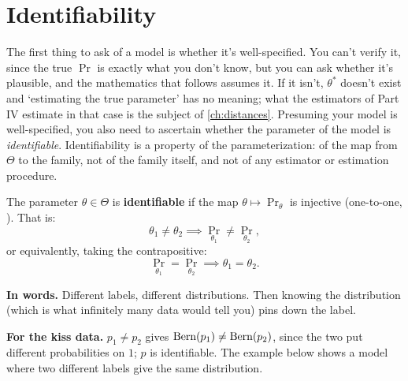 \section{Identifiability}
\label{sec:models-identifiability}

The first thing to ask of a model is whether it's well-specified.
You can't verify it, since the true $\Pr$ is exactly what you don't know, but you can ask whether it's plausible, and the mathematics that follows assumes it.
If it isn't, $\theta^*$ doesn't exist and `estimating the true parameter' has no meaning; what the estimators of Part IV estimate in that case is the subject of \cref{ch:distances}.
Presuming your model is well-specified, you also need to ascertain whether the parameter of the model is \textit{identifiable}.
Identifiability is a property of the parameterization: of the map from $\Theta$ to the family, not of the family itself, and not of any estimator or estimation procedure.

\begin{definition}[Identifiability]
\label{def:identifiable}
The parameter $\theta \in \Theta$ is \textbf{identifiable} if the map $\theta \mapsto \Pr_{\theta}$ is injective (one-to-one, ).
That is:
\[
\theta_1 \neq \theta_2 \implies \Pr_{\theta_1} \neq \Pr_{\theta_2},
\]
or equivalently, taking the contrapositive:
\[
\Pr_{\theta_1} = \Pr_{\theta_2} \implies \theta_1 = \theta_2.
\]
\end{definition}

\begin{inwords}
\textbf{In words.} Different labels, different distributions. Then knowing the distribution (which is what infinitely many data would tell you) pins down the label.
\par\smallskip
\textbf{For the kiss data.} $p_1 \neq p_2$ gives $\text{Bern}(p_1) \neq \text{Bern}(p_2)$, since the two put different probabilities on $1$; $p$ is identifiable. The example below shows a model where two different labels give the same distribution.
\end{inwords}

